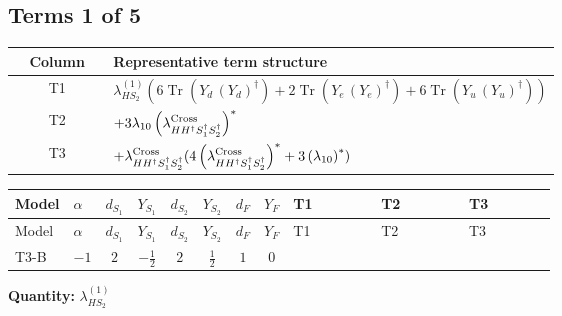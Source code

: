 \documentclass[8pt]{article}
\begin{document}
\begin{landscape}
\subsection*{Terms 1 of 5}
\begin{center}
\begin{tabular}{@{}c >{\raggedright\arraybackslash}p{0.82\linewidth}@{}}
\toprule
Column & Representative term structure \\
\midrule
T1 & \(\displaystyle {\lambda_{HS_2}^{(1)}} (6 \operatorname{Tr}\!\left({Y_d}\,\left({Y_d}\right)^{\dagger}\right)+2 \operatorname{Tr}\!\left({Y_e}\,\left({Y_e}\right)^{\dagger}\right)+6 \operatorname{Tr}\!\left({Y_u}\,\left({Y_u}\right)^{\dagger}\right))\) \\
\midrule
T2 & \(\displaystyle +3 {\lambda_{10}} \left({\lambda_{H H^\dagger S_1^\dagger S_2^\dagger}^{\rm Cross}}\right)^{*}\) \\
\midrule
T3 & \(\displaystyle +{\lambda_{H H^\dagger S_1^\dagger S_2^\dagger}^{\rm Cross}} (4 \left({\lambda_{H H^\dagger S_1^\dagger S_2^\dagger}^{\rm Cross}}\right)^{*}+3 \left({\lambda_{10}}\right)^{*})\) \\
\midrule
\bottomrule
\end{tabular}
\end{center}
\smallskip
\tiny
\begin{longtable}{@{}llcccccc >{\raggedright\arraybackslash}p{0.21\linewidth} >{\raggedright\arraybackslash}p{0.21\linewidth} >{\raggedright\arraybackslash}p{0.21\linewidth}@{}}
\toprule
Model & $\alpha$ & $d_{S_1}$ & $Y_{S_1}$ & $d_{S_2}$ & $Y_{S_2}$ & $d_F$ & $Y_F$ & T1 & T2 & T3 \\
\midrule
\endfirsthead
\toprule
Model & $\alpha$ & $d_{S_1}$ & $Y_{S_1}$ & $d_{S_2}$ & $Y_{S_2}$ & $d_F$ & $Y_F$ & T1 & T2 & T3 \\
\midrule
\endhead
T3-B & $-1$ & $2$ & $-\frac{1}{2}$ & $2$ & $\frac{1}{2}$ & $1$ & $0$ & \scriptsize\adjustbox{max width=\linewidth}{$\begin{gathered} {\lambda_{HS_2}^{(1)}} (6 \operatorname{Tr}\!\left({Y_d}\,\left({Y_d}\right)^{\dagger}\right)+2 \operatorname{Tr}\!\left({Y_e}\,\left({Y_e}\right)^{\dagger}\right)+6 \operatorname{Tr}\!\left({Y_u}\,\left({Y_u}\right)^{\dagger}\right))\end{gathered}$} & \scriptsize\adjustbox{max width=\linewidth}{$\begin{gathered} +3 {\lambda_{10}} \left({\lambda_{H H^\dagger S_1^\dagger S_2^\dagger}^{\rm Cross}}\right)^{*}\end{gathered}$} & \scriptsize\adjustbox{max width=\linewidth}{$\begin{gathered} +{\lambda_{H H^\dagger S_1^\dagger S_2^\dagger}^{\rm Cross}} (4 \left({\lambda_{H H^\dagger S_1^\dagger S_2^\dagger}^{\rm Cross}}\right)^{*}+3 \left({\lambda_{10}}\right)^{*})\end{gathered}$} \\
\midrule
\bottomrule
\end{longtable}
\clearpage
\noindent\textbf{Quantity: }$\lambda_{HS_2}^{(1)}$\par\smallskip

\end{landscape}
\end{document}
